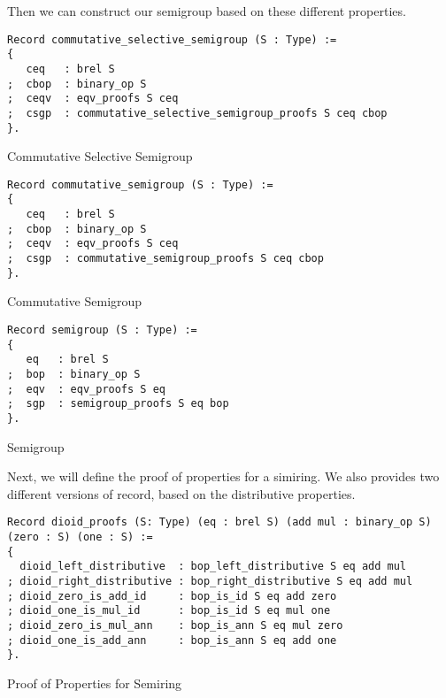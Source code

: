 Then we can construct our semigroup based on these different properties.
\begin{listing}[H]
\begin{verbatim}
Record commutative_selective_semigroup (S : Type) :=
{
   ceq   : brel S      
;  cbop  : binary_op S
;  ceqv  : eqv_proofs S ceq               
;  csgp  : commutative_selective_semigroup_proofs S ceq cbop
}.
\end{verbatim}
\caption{Commutative Selective Semigroup} 
\label{coq:def:commutative_selective_semigroup}
\end{listing}

\begin{listing}[H]
\begin{verbatim}
Record commutative_semigroup (S : Type) :=
{
   ceq   : brel S      
;  cbop  : binary_op S
;  ceqv  : eqv_proofs S ceq               
;  csgp  : commutative_semigroup_proofs S ceq cbop
}.
\end{verbatim}
\caption{Commutative Semigroup} 
\label{coq:def:commutative_semigroup}
\end{listing}

\begin{listing}[H]
\begin{verbatim}
Record semigroup (S : Type) :=
{
   eq   : brel S      
;  bop  : binary_op S
;  eqv  : eqv_proofs S eq               
;  sgp  : semigroup_proofs S eq bop
}.
\end{verbatim}
\caption{Semigroup} 
\label{coq:def:semigroup}
\end{listing}

Next, we will define the proof of properties for a simiring. We also provides two different versions of record, based on the distributive properties.

\begin{listing}[H]
\begin{verbatim}
Record dioid_proofs (S: Type) (eq : brel S) (add mul : binary_op S) (zero : S) (one : S) :=
{  
  dioid_left_distributive  : bop_left_distributive S eq add mul
; dioid_right_distributive : bop_right_distributive S eq add mul
; dioid_zero_is_add_id     : bop_is_id S eq add zero
; dioid_one_is_mul_id      : bop_is_id S eq mul one                                                      
; dioid_zero_is_mul_ann    : bop_is_ann S eq mul zero
; dioid_one_is_add_ann     : bop_is_ann S eq add one
}.
\end{verbatim}
\caption{Proof of Properties for Semiring} 
\label{coq:def:dioid_proofs}
\end{listing}

